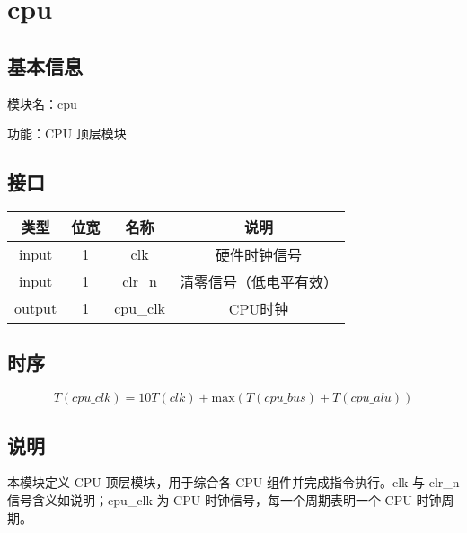 \section{cpu}
\subsection{基本信息}
模块名：cpu

功能：CPU 顶层模块
\subsection{接口}
\begin{tabular}{|c|c|c|c|}
    \hline
    类型    & 位宽 &   名称    &   说明\\\hline
    input   &  1  &   clk     &   硬件时钟信号\\\hline
    input   &  1  &   clr\_n   &   清零信号（低电平有效）\\\hline
    output  &  1  &   cpu\_clk &   CPU时钟\\\hline
\end{tabular}
\subsection{时序}
    $$T(\textit{cpu\_clk})=10T(\textit{clk})+\text{max}(T(\textit{cpu\_bus})+T(\textit{cpu\_alu}))$$
\subsection{说明}
本模块定义 CPU 顶层模块，用于综合各 CPU 组件并完成指令执行。clk 与 clr\_n 信号含义如说明；cpu\_clk 为 CPU 时钟信号，每一个周期表明一个 CPU 时钟周期。